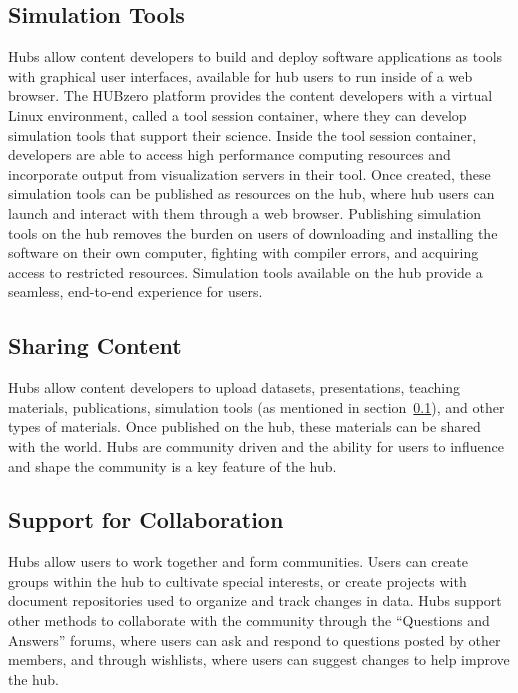 \subsection{Simulation Tools}
\label{ssec:simulation_tools}

Hubs allow content developers to build and deploy software applications as
tools with graphical user interfaces, available for hub users to run inside of
a web browser.  The HUBzero platform provides the content developers with a
virtual Linux environment, called a tool session container, where they can
develop simulation tools that support their science.  Inside the tool session
container, developers are able to access high performance computing resources
and incorporate output from visualization servers in their tool.  Once created,
these simulation tools can be published as resources on the hub, where hub
users can launch and interact with them through a web browser.  Publishing
simulation tools on the hub removes the burden on users of downloading and
installing the software on their own computer, fighting with compiler errors,
and acquiring access to restricted resources. Simulation tools available on the
hub provide a seamless, end-to-end experience for users.

\subsection{Sharing Content}
\label{ssec:sharing_content}

Hubs allow content developers to upload datasets, presentations, teaching
materials, publications, simulation tools (as mentioned in
section~\ref{ssec:simulation_tools}), and other types of materials. Once
published on the hub, these materials can be shared with the world. Hubs are
community driven and the ability for users to influence and shape the
community is a key feature of the hub.

\subsection{Support for Collaboration}
\label{ssec:support_for_collaboration}

Hubs allow users to work together and form communities. Users can create groups
within the hub to cultivate special interests, or create projects with document
repositories used to organize and track changes in data. Hubs support other
methods to collaborate with the community through the ``Questions and Answers''
forums, where users can ask and respond to questions posted by other members,
and through wishlists, where users can suggest changes to help improve the hub.

